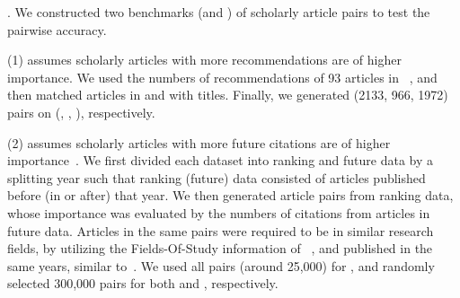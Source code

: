 .
We constructed two benchmarks (\recom and \fcita) of scholarly article pairs to test the pairwise accuracy.

\noindent
(1) \recom assumes scholarly articles with more recommendations are of higher importance.
We used the numbers of recommendations of 93 articles in \aan~\cite{Liang16AAAI}, %
and then matched articles in \aminer and \magdata with titles. %
Finally, we generated (2133, 966, 1972) pairs on (\aan, \aminer, \magdata), respectively.


\noindent
(2) \fcita assumes scholarly articles with more future citations are of higher importance~\cite{Wang13AAAI,Wang16TIST,Li08TSRanking}.
We first divided each dataset into ranking and future data by a splitting year such that ranking (future) data consisted of articles published before (in or after) that year. We then generated article pairs from ranking data, whose importance was evaluated by the numbers of citations from articles in future data.
Articles in the same pairs were required to be in similar research fields, by utilizing the Fields-Of-Study information of \magdata~\cite{Sinha15:MAG}, and published in the same years, similar to~\cite{Wang16TIST}.
We used all pairs (around 25,000) for \aan, and randomly selected 300,000 pairs for both \aminer and \magdata, respectively.


